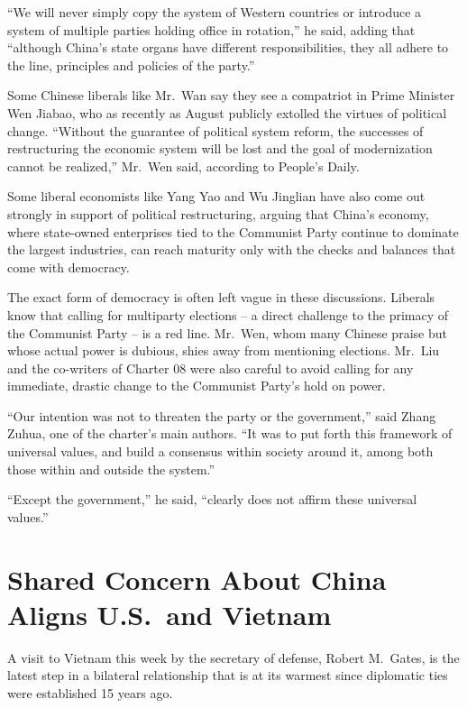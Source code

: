 ﻿\documentclass[12pt]{article}
\begin{document}
``We will never simply copy the system of Western countries or introduce a system of multiple
parties holding office in rotation,'' he said, adding that ``although China's state organs have
different responsibilities, they all adhere to the line, principles and policies of the party.''

Some Chinese liberals like Mr.~Wan say they see a compatriot in Prime Minister Wen Jiabao, who as
recently as August publicly extolled the virtues of political change. ``Without the guarantee of
political system reform, the successes of restructuring the economic system will be lost and the
goal of modernization cannot be realized,'' Mr.~Wen said, according to People's Daily.

Some liberal economists like Yang Yao and Wu Jinglian have also come out strongly in support of
political restructuring, arguing that China's economy, where state-owned enterprises tied to the
Communist Party continue to dominate the largest industries, can reach maturity only with the checks
and balances that come with democracy.

The exact form of democracy is often left vague in these discussions. Liberals know that calling for
multiparty elections -- a direct challenge to the primacy of the Communist Party -- is a red line.
Mr.~Wen, whom many Chinese praise but whose actual power is dubious, shies away from mentioning
elections. Mr.~Liu and the co-writers of Charter 08 were also careful to avoid calling for any
immediate, drastic change to the Communist Party's hold on power.

``Our intention was not to threaten the party or the government,'' said Zhang Zuhua, one of the
charter's main authors. ``It was to put forth this framework of universal values, and build a
consensus within society around it, among both those within and outside the system.''

``Except the government,'' he said, ``clearly does not affirm these universal values.''

\section{Shared Concern About China Aligns U.S.~and Vietnam}

\lettrine{A}{} visit to Vietnam this week by the secretary of defense,
Robert M.~Gates, is the latest step in a bilateral relationship that is at its warmest since
diplomatic ties were established 15 years ago.
\end{document}
